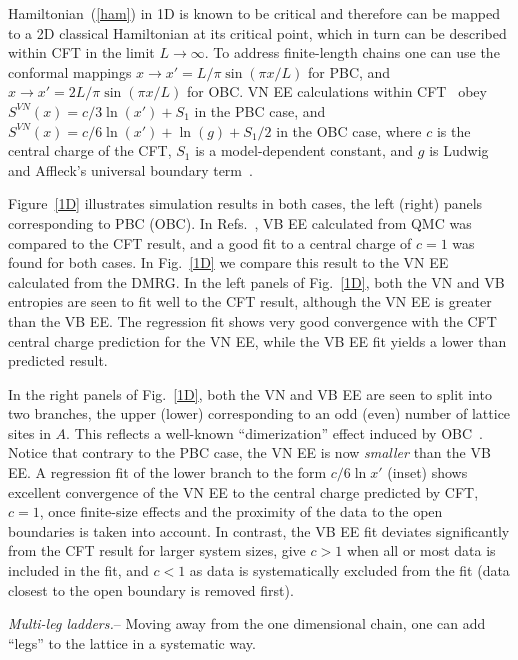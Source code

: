 \documentclass[prl,aps,twocolumn,floatfix,amsmath,amssymb,superscriptaddress,tightenlines]{revtex4}
\begin{document}
Hamiltonian~(\ref{ham}) in 1D is known to be critical and therefore can be
mapped to a 2D classical Hamiltonian at its critical point, which in turn
can be described within CFT in the limit $L\to\infty$.  To address
finite-length chains one can use the conformal mappings $x\to x'=L/\pi
\sin(\pi x / L)$ for PBC, and $x\to x'=2L/\pi \sin(\pi x / L)$ for OBC. VN
EE calculations within CFT~\cite{Cardy, Scholl06} obey $S^{VN}(x)= c/3
\ln(x') + S_1$ in the PBC case, and $S^{VN}(x)= c/6 \ln(x') +
\ln(g)+S_1/2$ in the OBC case, where $c$ is the central charge of the CFT,
$S_1$ is a model-dependent constant, and $g$ is Ludwig and Affleck's
universal boundary term~\cite{AffleckAndLudwig}.

Figure~\ref{1D} illustrates simulation results in both cases, the left
(right) panels corresponding to PBC (OBC). In Refs.~\cite{Alet, Chh}, VB
EE calculated from QMC was compared to the CFT result, and a good fit to a
central charge of $c=1$ was found for both cases.  In Fig.~\ref{1D} we
compare this result to the VN EE calculated from the DMRG.  In the left
panels of Fig.~\ref{1D}, both the VN and VB entropies are seen to fit well
to the CFT result, although the VN EE is greater than the VB EE. The
regression fit shows very good convergence with the CFT central charge
prediction for the VN EE, while the VB EE fit yields a lower than
predicted result.  

In the right panels of Fig.~\ref{1D}, both the VN and VB EE are seen to
split into two branches, the upper (lower) corresponding to an odd (even)
number of lattice sites in $A$.  This reflects a well-known
``dimerization'' effect induced by OBC~\cite{Ian1}.  Notice that contrary
to the PBC case, the VN EE is now \textit{smaller} than the VB EE. A
regression fit of the lower branch to the form $c/6 \ln {x'}$ (inset)
shows excellent convergence of the VN EE to the central charge predicted
by CFT, $c=1$, once finite-size effects and the proximity of the data to
the open boundaries is taken into account.  In contrast, the VB EE fit
deviates significantly from the CFT result for larger system sizes, give
$c>1$ when all or most data is included in the fit, and $c<1$ as data is
systematically excluded from the fit (data closest to the open boundary is
removed first).

{\it Multi-leg ladders.}-- Moving away from the one dimensional chain, one
can add ``legs'' to the lattice in a systematic way. 
\end{document}
